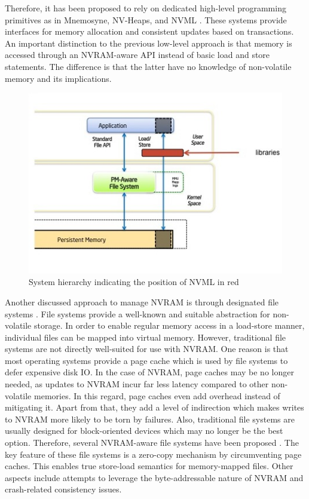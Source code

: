Therefore, it has been proposed to rely on dedicated high-level programming
primitives as in Mnemosyne, NV-Heaps, and NVML \cite{volos2011mnemosyne,
coburn2011nv_heaps, intel2017nvml}. These systems provide interfaces for memory
allocation and consistent updates based on transactions. An important
distinction to the previous low-level approach is that memory is accessed
through an \ac{NVRAM}-aware \ac{API} instead of basic load and store statements.
The difference is that the latter have no knowledge of non-volatile memory and
its implications.

\begin{figure}[!ht]
    \centering
    \includegraphics[scale=0.75]{figures/nvml-arch.jpg}
    \caption{System hierarchy indicating the position of NVML in red \cite{intel2014nvml}}
    \label{fig:nvml}
\end{figure}

Another discussed approach to manage \ac{NVRAM} is through designated file
systems \cite{oukid2017data, andrei2017sap}. File systems provide a well-known
and suitable abstraction for non-volatile storage. In order to enable regular
memory access in a load-store manner, individual files can be mapped into
virtual memory. However, traditional file systems are not directly well-suited
for use with \ac{NVRAM}. One reason is that most operating systems provide a
page cache which is used by file systems to defer expensive disk \ac{IO}. In the
case of \ac{NVRAM}, page caches may be no longer needed, as updates to
\ac{NVRAM} incur far less latency compared to other non-volatile memories. In
this regard, page caches even add overhead instead of mitigating it. Apart from
that, they add a level of indirection which makes writes to \ac{NVRAM} more
likely to be torn by failures. Also, traditional file systems are usually
designed for block-oriented devices which may no longer be the best option.
Therefore, several \ac{NVRAM}-aware file systems have been proposed
\cite{condit2009better, wu2011scmfs, dulloor2014system, xu2016nova}. The key
feature of these file systems is a zero-copy mechanism by circumventing page
caches. This enables true store-load semantics for memory-mapped files. Other
aspects include attempts to leverage the byte-addressable nature of \ac{NVRAM}
and crash-related consistency issues.

